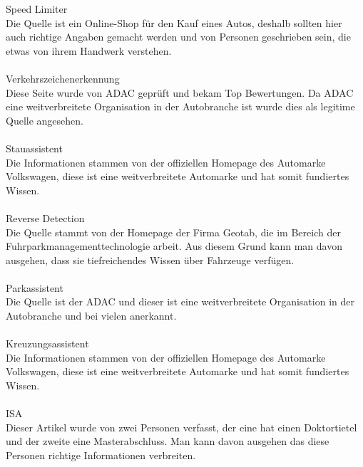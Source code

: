Speed Limiter \cite{speedlimiter.PB1}\\
Die Quelle ist ein Online-Shop für den Kauf eines Autos, deshalb sollten hier auch richtige Angaben gemacht werden und von Personen geschrieben sein, die etwas von 
ihrem Handwerk verstehen.\\\\

Verkehrszeichenerkennung \cite{verkehrszeichenerk.PB2}\\
Diese Seite wurde von ADAC geprüft und bekam Top Bewertungen. Da ADAC eine weitverbreitete Organisation in der Autobranche ist wurde dies als legitime Quelle angesehen.\\\\

Stauassistent \cite{stauassi.PB1}\\
Die Informationen stammen von der offiziellen Homepage des Automarke Volkswagen, diese ist eine weitverbreitete Automarke und hat somit fundiertes Wissen.\\\\

Reverse Detection \cite{reversedetection.PB1}\\
Die Quelle stammt von der Homepage der Firma Geotab, die im Bereich der Fuhrparkmanagementtechnologie arbeit. Aus diesem Grund kann man davon ausgehen, dass sie 
tiefreichendes Wissen über Fahrzeuge verfügen.\\\\

Parkassistent \cite{parkassi.PB2}\\
Die Quelle ist der ADAC und dieser ist eine weitverbreitete Organisation in der Autobranche und bei vielen anerkannt.\\\\

Kreuzungsassistent \cite{kreuzungsassi.PB2}\\
Die Informationen stammen von der offiziellen Homepage des Automarke Volkswagen, diese ist eine weitverbreitete Automarke und hat somit fundiertes Wissen.\\\\

ISA \cite{ISA.PB2}\\
Dieser Artikel wurde von zwei Personen verfasst, der eine hat einen Doktortietel und der zweite eine Masterabschluss. Man kann davon ausgehen das diese 
Personen richtige Informationen verbreiten.\\\\

